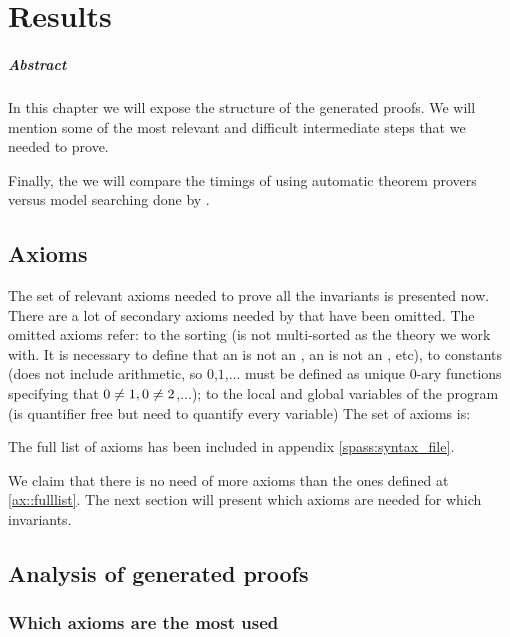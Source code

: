 \chapter{Results\label{chap:results}}

\paragraph{Abstract} In this chapter we will expose the structure of the generated proofs. We will mention some of the most relevant and difficult intermediate steps that we needed to prove.

Finally, the we will compare the timings of using automatic theorem provers versus model searching done by .

\section{Axioms}

The set of relevant axioms needed to prove all the invariants is presented now.
%
There are a lot of secondary axioms needed by \spass that have been omitted. 
%
The omitted axioms refer: 
%
to the sorting (\spass is not multi-sorted as the theory we work with. It is necessary to define that an \addr is not an \elem, an \elem is not an \addr, etc), to constants (\spass does not include arithmetic, so $0$,$1$,... must be defined as unique 0-ary functions specifying that $0\not= 1,0\not= 2$,...); 
%
to the local and global variables of the program (\leap is quantifier free but \spass need to quantify every variable)
%
The set of axioms is:
		
\begin{description}
\label{ax::fulllist}

\end{description}


The full list of axioms has been included in appendix \ref{spass:syntax_file}.

We claim that there is no need of more axioms than the ones defined at \ref{ax::fulllist}. 
%
The next section will present which axioms are needed for which invariants.

\section{Analysis of generated proofs}
\label{proof:Preserve}
\label{sec:axiomgraph}


\subsection{Which axioms are the most used}


